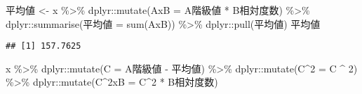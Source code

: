 \documentclass[
  12pt,
]{book}
\newenvironment{Shaded}{\begin{snugshade}}{\end{snugshade}}
\newcommand{\AttributeTok}[1]{\textcolor[rgb]{0.77,0.63,0.00}{#1}}
\newcommand{\DecValTok}[1]{\textcolor[rgb]{0.00,0.00,0.81}{#1}}
\newcommand{\FunctionTok}[1]{\textcolor[rgb]{0.00,0.00,0.00}{#1}}
\newcommand{\NormalTok}[1]{#1}
\newcommand{\OtherTok}[1]{\textcolor[rgb]{0.56,0.35,0.01}{#1}}
\newcommand{\SpecialCharTok}[1]{\textcolor[rgb]{0.00,0.00,0.00}{#1}}
\newcommand{\StringTok}[1]{\textcolor[rgb]{0.31,0.60,0.02}{#1}}
\begin{document}
\begin{Shaded}
\begin{Highlighting}[]
\StringTok{\textasciigrave{}}\AttributeTok{平均値}\StringTok{\textasciigrave{}} \OtherTok{\textless{}{-}}\NormalTok{ x }\SpecialCharTok{\%\textgreater{}\%} 
\NormalTok{  dplyr}\SpecialCharTok{::}\FunctionTok{mutate}\NormalTok{(}\StringTok{\textasciigrave{}}\AttributeTok{AxB}\StringTok{\textasciigrave{}} \OtherTok{=} \StringTok{\textasciigrave{}}\AttributeTok{A階級値}\StringTok{\textasciigrave{}} \SpecialCharTok{*} \StringTok{\textasciigrave{}}\AttributeTok{B相対度数}\StringTok{\textasciigrave{}}\NormalTok{) }\SpecialCharTok{\%\textgreater{}\%} 
\NormalTok{  dplyr}\SpecialCharTok{::}\FunctionTok{summarise}\NormalTok{(}\StringTok{\textasciigrave{}}\AttributeTok{平均値}\StringTok{\textasciigrave{}} \OtherTok{=} \FunctionTok{sum}\NormalTok{(}\StringTok{\textasciigrave{}}\AttributeTok{AxB}\StringTok{\textasciigrave{}}\NormalTok{)) }\SpecialCharTok{\%\textgreater{}\%} 
\NormalTok{  dplyr}\SpecialCharTok{::}\FunctionTok{pull}\NormalTok{(}\StringTok{\textasciigrave{}}\AttributeTok{平均値}\StringTok{\textasciigrave{}}\NormalTok{)}
\StringTok{\textasciigrave{}}\AttributeTok{平均値}\StringTok{\textasciigrave{}}
\end{Highlighting}
\end{Shaded}

\begin{verbatim}
## [1] 157.7625
\end{verbatim}

\begin{Shaded}
\begin{Highlighting}[]
\NormalTok{x }\SpecialCharTok{\%\textgreater{}\%} 
\NormalTok{  dplyr}\SpecialCharTok{::}\FunctionTok{mutate}\NormalTok{(}\StringTok{\textasciigrave{}}\AttributeTok{C}\StringTok{\textasciigrave{}} \OtherTok{=} \StringTok{\textasciigrave{}}\AttributeTok{A階級値}\StringTok{\textasciigrave{}} \SpecialCharTok{{-}} \StringTok{\textasciigrave{}}\AttributeTok{平均値}\StringTok{\textasciigrave{}}\NormalTok{) }\SpecialCharTok{\%\textgreater{}\%} 
\NormalTok{  dplyr}\SpecialCharTok{::}\FunctionTok{mutate}\NormalTok{(}\StringTok{\textasciigrave{}}\AttributeTok{C\^{}2}\StringTok{\textasciigrave{}} \OtherTok{=} \StringTok{\textasciigrave{}}\AttributeTok{C}\StringTok{\textasciigrave{}} \SpecialCharTok{\^{}} \DecValTok{2}\NormalTok{) }\SpecialCharTok{\%\textgreater{}\%} 
\NormalTok{  dplyr}\SpecialCharTok{::}\FunctionTok{mutate}\NormalTok{(}\StringTok{\textasciigrave{}}\AttributeTok{C\^{}2xB}\StringTok{\textasciigrave{}} \OtherTok{=} \StringTok{\textasciigrave{}}\AttributeTok{C\^{}2}\StringTok{\textasciigrave{}} \SpecialCharTok{*} \StringTok{\textasciigrave{}}\AttributeTok{B相対度数}\StringTok{\textasciigrave{}}\NormalTok{)}
\end{Highlighting}
\end{Shaded}
\end{document}
